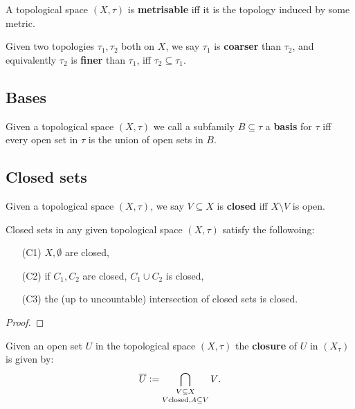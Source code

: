 \documentclass[../Year2.tex]{subfiles}
\begin{document}
\begin{definition}[Metrisability]
    A topological space $(X,\tau)$ is \textbf{metrisable} iff it is the topology induced by some metric.
\end{definition}

\begin{definition}
    Given two topologies $\tau_1,\tau_2$ both on $X$, we say $\tau_1$ is \textbf{coarser} than $\tau_2$, and equivalently $\tau_2$ is \textbf{finer} than $\tau_1$, iff $\tau_2\subseteq\tau_1$.
\end{definition}

\subsection{Bases}

\begin{definition}[Basis]
    Given a topological space $(X,\tau)$ we call a subfamily $B\subseteq\tau$ a \textbf{basis} for $\tau$ iff every open set in $\tau$ is the union of open sets in $B$.
\end{definition}

\subsection{Closed sets}

\begin{definition}
    Given a topological space $(X,\tau)$, we say $V\subseteq X$ is \textbf{closed} iff $X\setminus V$ is open.
\end{definition}

\begin{proposition}
    Closed sets in any given topological space $(X,\tau)$ satisfy the followoing: \begin{enumerate}
        \item[(C1)] $X,\emptyset$ are closed,
        \item[(C2)] if $C_1,C_2$ are closed, $C_1\cup C_2$ is closed,
        \item[(C3)] the (up to uncountable) intersection of closed sets is closed.
    \end{enumerate}
    \begin{proof}
        
    \end{proof}
\end{proposition}

\begin{definition}[Closure]
    Given an open set $U$ in the topological space $(X,\tau)$ the \textbf{closure} of $U$ in $(X_\tau)$ is given by: \[
        \overline{U}:=\mathop{\bigcap_{V\subseteq X}}_{V  \text{\textcolor{black}{closed}}, A\subseteq V}V
    \text{\textcolor{black}{.}}
        \]
\end{definition}
\end{document}
